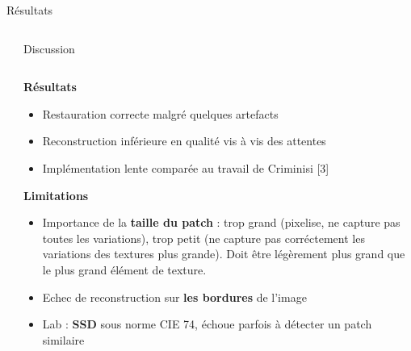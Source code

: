 \documentclass[final,hyperref={pdfpagelabels=false}]{beamer}
\begin{document}
\begin{frame}[t]
\begin{columns}[t]
\begin{column}{.465\textwidth}
\begin{block}{\Large Résultats}
\end{block}

\end{column}


\end{columns}

\begin{columns}[t]
\begin{column}{.02\textwidth} \end{column}
\begin{column}{.930\textwidth} 
\begin{block}{\Large Discussion}
\begin{columns}[t]
\begin{column}{.496\textwidth}

\textbf{Résultats}
\begin{itemize}
\item Restauration correcte malgré quelques artefacts
\item Reconstruction inférieure en qualité vis à vis des attentes
\item Implémentation lente comparée au travail de Criminisi [3]
\end{itemize}
\textbf{Limitations}
\begin{itemize}
\item Importance de la \textbf{taille du patch} : trop grand (pixelise, ne capture pas toutes les variations), trop petit (ne capture pas corréctement les variations des textures plus grande). Doit être légèrement plus grand que le plus grand élément de texture. 
\item Echec de reconstruction sur \textbf{les bordures} de l'image
\item Lab : \textbf{SSD} sous norme CIE 74, échoue parfois à détecter un patch similaire
\end{itemize}



\end{column}
\end{columns}
\end{block}
\end{column}
\end{columns}
\end{frame}
\end{document}
